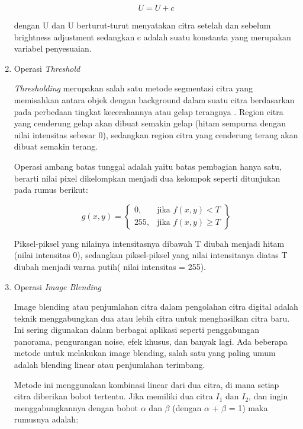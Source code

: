 \begin{enumerate}[leftmargin=1cm, itemindent=0.6cm,labelwidth=15pt, labelsep=5pt, listparindent=1cm,align=left]
        \begin{equation}
            U = U + c
        \end{equation}

dengan U dan U berturut-turut menyatakan citra setelah dan sebelum brightness adjustment sedangkan c adalah suatu konstanta yang merupakan variabel penyesuaian.

	\item Operasi \textit{Threshold}

        \textit{Thresholding} merupakan salah satu metode segmentasi citra yang memisahkan antara objek dengan background dalam suatu citra berdasarkan pada perbedaan tingkat kecerahannya atau gelap terangnya \cite{Setiawan_Dewanta_Nugroho_Supriyono_2019}. Region citra yang cenderung gelap akan dibuat semakin gelap (hitam sempurna dengan nilai intensitas sebesar 0), sedangkan region citra yang cenderung terang akan dibuat semakin terang.

Operasi ambang batas tunggal adalah yaitu batas pembagian hanya satu, berarti nilai pixel dikelompkan menjadi dua kelompok seperti ditunjukan pada rumus berikut:

        \begin{equation}
            g(x,y) = 
            \left\{
            \begin{array}{ll}
            0, & \text{jika } f(x,y) < T \\
            255, & \text{jika } f(x,y) \geq T 
            \end{array}
            \right \}
        \end{equation}

Piksel-piksel yang nilainya intensitasnya dibawah T diubah menjadi hitam (nilai intensitas 0), sedangkan piksel-piksel yang nilai intensitanya diatas T diubah menjadi warna putih( nilai intensitas = 255).

	\item Operasi \textit{Image Blending}

Image blending atau penjumlahan citra dalam pengolahan citra digital adalah teknik menggabungkan dua atau lebih citra untuk menghasilkan citra baru. Ini sering digunakan dalam berbagai aplikasi seperti penggabungan panorama, pengurangan noise, efek khusus, dan banyak lagi. Ada beberapa metode untuk melakukan image blending, salah satu yang paling umum adalah blending linear atau penjumlahan terimbang.

Metode ini menggunakan kombinasi linear dari dua citra, di mana setiap citra diberikan bobot tertentu. Jika memiliki dua citra \(I_1\) dan \(I_2\), dan ingin menggabungkannya dengan bobot \(\alpha\) dan \(\beta\) (dengan \(\alpha\) + \(\beta\) = 1) maka rumusnya adalah:


\end{enumerate}
